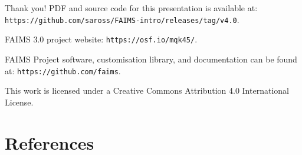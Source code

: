 \documentclass[aspectratio=169, 12pt]{beamer} %
\begin{document}
\begin{frame}{Thank you!}
PDF and source code for this presentation is available at: 
\texttt{https://github.com/saross/FAIMS-intro/releases/tag/v4.0}.

FAIMS 3.0 project website: \texttt{https://osf.io/mqk45/}.

FAIMS Project software, customisation library, and documentation can be found at:
\texttt{https://github.com/faims}.


This work is licensed under a Creative Commons Attribution 4.0 International License.

\end{frame}


\section{References}


  
%   
%   

\begin{multicols}{2}[]



\end{multicols}





    
\end{document}
